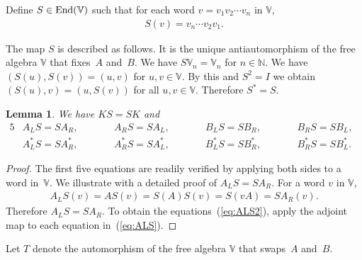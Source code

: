 \documentclass[pdftex]{sigma}
\numberwithin{equation}{section}
\newtheorem{Lemma}[Theorem]{Lemma}
\begin{document}
\begin{Definition}\label{def:S}Define $S \in {\rm End}(\mathbb V)$ such that for each word $v = v_1 v_2 \cdots v_n$ in $\mathbb V$,
\begin{gather*}
S(v) = v_n \cdots v_2 v_1.
\end{gather*}
\end{Definition}
The map $S$ is described as follows. It is the unique antiautomorphism of the free algebra $\mathbb V$
that fixes~$A$ and~$B$. We have
$S \mathbb V_n = \mathbb V_n$ for $n \in \mathbb N$.
We have $(S(u), S(v))= (u,v) $ for $u,v \in \mathbb V$. By this and
$S^2=I$ we obtain
$(S(u),v)= (u,S(v))$ for all $u,v \in \mathbb V$. Therefore
$S^*=S$.
\begin{Lemma}\label{lem:scom} We have $KS=SK$ and
\begin{alignat}{5}
&A_L S = S A_R, \qquad &&
A_R S = S A_L, \qquad &&
B_L S = S B_R, \qquad &&
B_R S = S B_L, &\label{eq:ALS}
\\
& A^*_L S = S A^*_R, \qquad &&
A^*_R S = S A^*_L, \qquad &&
B^*_L S = S B^*_R, \qquad &&
B^*_R S = S B^*_L. &\label{eq:ALS2}
\end{alignat}
\end{Lemma}
\begin{proof}The first five equations are readily verified by applying both sides to
a word in~$\mathbb V$. We illustrate with a detailed proof of
$A_LS=SA_R$.
For a word $v$ in $\mathbb V$,
\begin{gather*}
A_L S(v) = AS(v) = S(A)S(v)= S(vA) = S A_R(v).
\end{gather*}
Therefore
$A_LS=SA_R$.
To obtain the equations~(\ref{eq:ALS2}), apply the adjoint map to each equation in~(\ref{eq:ALS}).
\end{proof}

\begin{Definition}\label{def:T}Let $T$ denote the automorphism of the free algebra $\mathbb V$ that
swaps~$A$ and~$B$.
\end{Definition}
\end{document}
